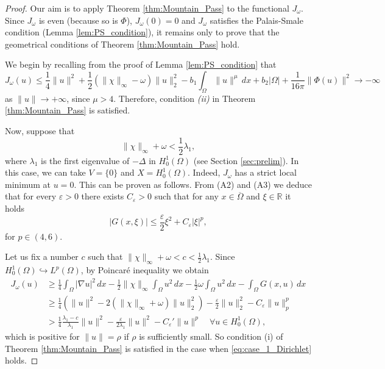 \documentclass[10pt,a4paper]{amsart}
\numberwithin{equation}{section}
\begin{document}
\begin{proof}
Our aim is to apply Theorem \ref{thm:Mountain_Pass} to the functional $J_\omega$. 
Since $J_\omega$ is even (because so is $\Phi$), $J_\omega(0) = 0$ and 
$J_\omega$ satisfies the Palais-Smale condition (Lemma \ref{lem:PS_condition}), 
it remains only to prove that the geometrical conditions of Theorem 
\ref{thm:Mountain_Pass} hold.

We begin by recalling from the proof of Lemma \ref{lem:PS_condition} that
\[
 J_\omega(u)
 \leq \frac{1}{4}\|u\|^2 + \frac{1}{2}(\|\chi\|_\infty - \omega) \|u\|_2^2 
 - b_1 \int_\Omega \|u\|^\mu \,dx + b_2 |\Omega| 
 + \frac{1}{16\pi}\|\Phi(u)\|^2  
 \to - \infty
\]
as $\|u\| \to + \infty$, since $\mu > 4$. Therefore, condition \textit{(ii)} 
in Theorem \ref{thm:Mountain_Pass} is satisfied.

Now, suppose that
\begin{equation}
 \label{eq:case_1_Dirichlet}
 \|\chi\|_\infty + \omega < \frac{1}{2} \lambda_1,
\end{equation}
where $\lambda_1$ is the first eigenvalue of $- \Delta$ in $H_0^1(\Omega)$ 
(see Section \ref{sec:prelim}). In this case, we can take $V = \{0\}$ and 
$X = H_0^1(\Omega)$. Indeed, $J_\omega$ has a strict local minimum at $u = 0$.
This can be proven as follows. From (A2) and (A3) we deduce that for every 
$\varepsilon > 0$ there exists $C_\varepsilon > 0$ such that for any 
$x \in \overline \Omega$ and $\xi \in \mathbb R$ it holds
\[
 |G(x, \xi)| \leq \frac{\varepsilon}{2} \xi^2 + C_\varepsilon |\xi|^p,
\]
for $p \in (4, 6)$.

Let us fix a number $c$ such that $\|\chi\|_\infty + \omega < c < \frac{1}{2} \lambda_1$. 
Since $H_0^1(\Omega) \hookrightarrow L^p(\Omega)$, by Poincar\'e inequality we obtain
\begin{align*}
 J_\omega(u)
 & \geq \frac{1}{4} \int_\Omega |\nabla u|^2 \,dx 
  - \frac{1}{2} \|\chi\|_\infty \int_\Omega u^2 \,dx 
  - \frac{1}{2} \omega \int_\Omega u^2 \,dx - \int_\Omega G(x, u) \,dx  \\
 & \geq \frac{1}{4}(\|u\|^2 - 2(\|\chi\|_\infty + \omega) \|u\|_2^2) 
  - \frac{\varepsilon}{2} \|u\|_2^2 - C_\varepsilon \|u\|_p^p  \\
 & > \frac{1}{4} \frac{\lambda_1 - c}{\lambda_1}\|u\|^2 
  - \frac{\varepsilon}{2 \lambda_1} \|u\|^2 
  - C_\varepsilon' \|u\|^p \quad \forall u \in H_0^1(\Omega),
\end{align*}
which is positive for $\|u\| = \rho$ if $\rho$ is sufficiently small. 
So condition (i) of Theorem \ref{thm:Mountain_Pass} is satisfied in the case 
when \eqref{eq:case_1_Dirichlet} holds.


\end{proof}
\end{document}
